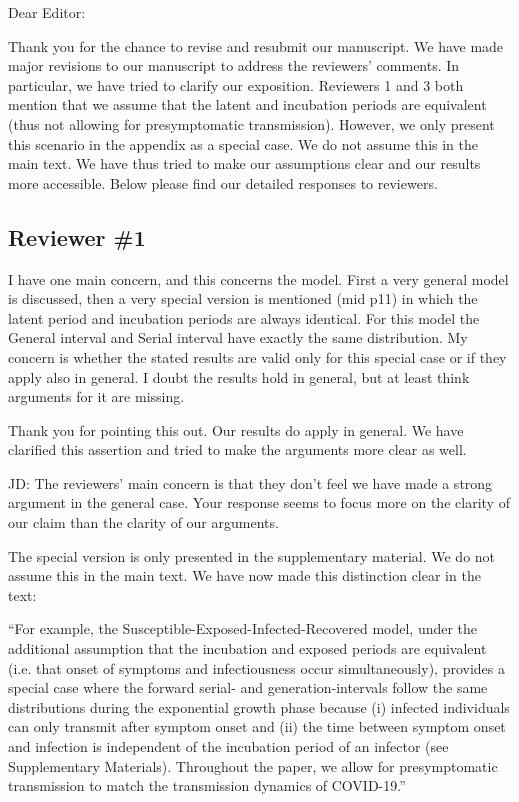 \documentclass[12pt]{article}
\newcommand{\rev}{\subsection*}
\newcommand{\revtext}{\textsf}
\begin{document}
\noindent Dear Editor:

Thank you for the chance to revise and resubmit our manuscript. 
We have made major revisions to our manuscript to address the reviewers' comments.
In particular, we have tried to clarify our exposition.
Reviewers 1 and 3 both mention that we assume that the latent and incubation periods are equivalent (thus not allowing for presymptomatic transmission). 
However, we only present this scenario in the appendix as a special case.
We do not assume this in the main text.
We have thus tried to make our assumptions clear and our results more accessible.
Below please find our detailed responses to reviewers.

\rev{Reviewer \#1}

\revtext{I have one main concern, and this concerns the model. First a very general model is discussed, then a very special version is mentioned (mid p11) in which the latent period and incubation periods are always identical. For this model the General interval and Serial interval have exactly the same distribution. My concern is whether the stated results are valid only for this special case or if they apply also in general. I doubt the results hold in general, but at least think arguments for it are missing.}

Thank you for pointing this out. Our results do apply in general. We have clarified this assertion and tried to make the arguments more clear as well. 

JD: The reviewers' main concern is that they don't feel we have made a strong argument in the general case. Your response seems to focus more on the clarity of our claim than the clarity of our arguments.

The special version is only presented in the supplementary material. We do not assume this in the main text. We have now made this distinction clear in the text:

``For example, the Susceptible-Exposed-Infected-Recovered model, under the additional assumption that the incubation and exposed periods are equivalent (i.e. that onset of symptoms and infectiousness occur simultaneously), provides a special case where the forward serial- and generation-intervals follow the same distributions during the exponential growth phase because (i) infected individuals can only transmit after symptom onset and (ii) the time between symptom onset and infection is independent of the incubation period of an infector (see Supplementary Materials).
Throughout the paper, we allow for presymptomatic transmission to match the transmission dynamics of COVID-19.''
\end{document}
